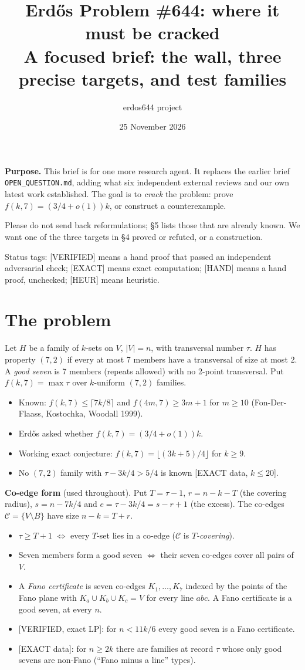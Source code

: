 \documentclass[11pt]{article}
\title{Erd\H{o}s Problem \#644: where it must be cracked\\[2pt]
\large A focused brief: the wall, three precise targets, and test families}
\author{erdos644 project}
\date{25 November 2026}
\newcommand{\st}[1]{\textsf{\small[#1]}}
\begin{document}
\maketitle

\noindent\textbf{Purpose.} This brief is for one more research agent. It replaces the earlier brief
\texttt{OPEN\_QUESTION.md}, adding what six independent external reviews and our own latest work established. The goal is
to \emph{crack} the problem: prove $f(k,7)=(3/4+o(1))k$, or construct a counterexample.

Please do not send back reformulations; \S5 lists those that are already known. We want one of the three targets in
\S4 proved or refuted, or a construction.

Status tags: \st{VERIFIED} means a hand proof that passed an independent adversarial check; \st{EXACT} means exact
computation; \st{HAND} means a hand proof, unchecked; \st{HEUR} means heuristic.

\section{The problem}
Let $H$ be a family of $k$-sets on $V$, $|V|=n$, with transversal number $\tau$. $H$ has property $(7,2)$ if every at most 7
members have a transversal of size at most 2. A \emph{good seven} is 7 members (repeats allowed) with no 2-point
transversal. Put $f(k,7)=\max\tau$ over $k$-uniform $(7,2)$ families.
\begin{itemize}
\item Known: $f(k,7)\le\lceil7k/8\rceil$ and $f(4m,7)\ge3m+1$ for $m\ge10$ (Fon-Der-Flaass, Kostochka, Woodall 1999).
\item Erd\H{o}s asked whether $f(k,7)=(3/4+o(1))k$.
\item Working exact conjecture: $f(k,7)=\lfloor(3k+5)/4\rfloor$ for $k\ge9$.
\item No $(7,2)$ family with $\tau-3k/4>5/4$ is known \st{EXACT data, $k\le20$}.
\end{itemize}

\noindent\textbf{Co-edge form} (used throughout). Put $T=\tau-1$, $r=n-k-T$ (the covering radius), $s=n-7k/4$ and
$e=\tau-3k/4=s-r+1$ (the excess). The co-edges $\mathcal C=\{V\setminus B\}$ have size $n-k=T+r$.
\begin{itemize}
\item $\tau\ge T+1$ $\iff$ every $T$-set lies in a co-edge ($\mathcal C$ is \emph{$T$-covering}).
\item Seven members form a good seven $\iff$ their seven co-edges cover all pairs of $V$.
\item A \emph{Fano certificate} is seven co-edges $K_1,\dots,K_7$ indexed by the points of the Fano plane with
$K_a\cup K_b\cup K_c=V$ for every line $abc$. A Fano certificate is a good seven, at every $n$.
\item \st{VERIFIED, exact LP}: for $n<11k/6$ every good seven is a Fano certificate.
\item \st{EXACT data}: for $n\ge2k$ there are families at record $\tau$ whose only good sevens are non-Fano (``Fano minus a
line'' types).
\end{itemize}
\end{document}
